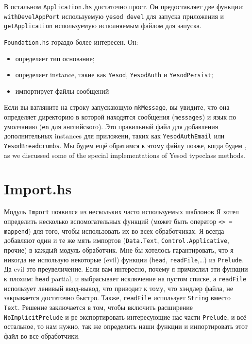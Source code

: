 В остальном \texttt{Application.hs} достаточно прост. Он предоставляет две функции:
\lstinline!withDevelAppPort! используемую \lstinline!yesod devel! для запуска приложения
и \lstinline!getApplication! используемую исполняемым файлом для запуска.

\texttt{Foundation.hs} гораздо более интересен. Он:
\begin{itemize}
      \item определяет тип основание;
      \item определяет instance, такие как \lstinline!Yesod!, \lstinline!YesodAuth! и \lstinline!YesodPersist!;
      \item импортирует файлы сообщений
\end{itemize}

Если вы взгляните на строку запускающую \lstinline!mkMessage!, вы увидите, что она определяет директорию 
в которой находятся сообщения (\lstinline!messages!) и язык по умолчанию (\lstinline!en! для английского).
Это правильный файл для добавления дополнительных instances для приложени, таких как \lstinline!YesodAuthEmail! 
или \lstinline!YesodBreadcrumbs!. Мы будем ещё обратимся к этому файлу позже, когда будем ,
as we discussed some of the special implementations of Yesod typeclass methods.

\section{Import.hs}

Модуль \texttt{Import} появился из нескольких часто используемых шаблонов
Я хотел определить несколько вспомогательных функций (может быть оператор \lstinline!<> = mappend!) 
для того, чтобы использовать их во всех обработчиках. Я всегда добавляют один и те же мять
импортов  (\lstinline!Data.Text!, \lstinline!Control.Applicative!, прочие) в каждый модуль обработчик.
Мне бы хотелось гарантировать, что я никогда не использую некоторые (evil) функции (\lstinline!head!,
\lstinline!readFile!,\ldots) из \lstinline!Prelude!. Да evil это преувеличение. Если вам интересно,
почему я причислил эти функции к плохим: \lstinline!head! partial, и выбрасывает исключение на пустом
списке, а \lstinline!readFile! использует ленивый ввод-вывод, что приводит к тому, что хэндлер файла,
не закрывается достаточно быстро. Также, \lstinline!readFile! использует \lstinline!String! вместо
\lstinline!Text!. Решение заключается в том, чтобы включить расширение \texttt{NoImplicitPrelude} и
ре-экспортировать интересующие нас части \lstinline!Prelude!, и всё остальное, то нам нужно, так же
определить наши функции и инпортировать этот файл во все обработчики.

